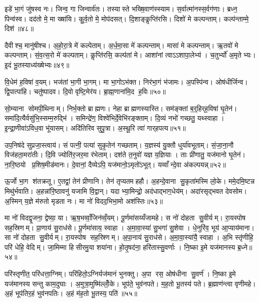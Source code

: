 इडे॑ भा॒गं जु॑षस्व नः। जिन्व॒ गा जिन्वार्व॑तः। तस्यास्ते भख्षि॒वाण॑स्स्याम। स॒र्वात्मा॑नस्स॒र्वग॑णाः। ब्रध्न॒ पिन्व॑स्व। दद॑तो मे॒ मा ख्षा॑यि। कु॒र्व॒तो मे॒ मोप॑दसत्। दि॒शाङ्कॢप्ति॑रसि। दिशो॑ मे कल्पन्ताम्। कल्प॑न्ताम्मे॒ दिश॑॥४८॥

दैवीश्च॒ मानु॑षीश्च। अ॒हो॒रा॒त्रे मे॑ कल्पेताम्। अ॒र्ध॒मा॒सा मे॑ कल्पन्ताम्। मासा॑ मे कल्पन्ताम्। ऋ॒तवो॑ मे कल्पन्ताम्। सं॒व॒त्स॒रो मे॑ कल्पताम्। कॢप्ति॑रसि॒ कल्प॑तां मे। आशा॑नां त्वाऽऽशापा॒लेभ्य॑। च॒तुर्भ्यो॑ अ॒मृतेभ्यः। इ॒दं भू॒तस्याध्य॑ख्षेभ्यः॥४९॥

वि॒धेम॑ ह॒विषा॑ व॒यम्। भज॑तां भा॒गी भा॒गम्। मा भा॒गोऽभ॑क्त। निर॑भा॒गं भ॑जामः। अ॒पस्पि॑न्व। ओष॑धीर्जिन्व। द्वि॒पात्पा॑हि। चतु॑ष्पादव। दि॒वो वृष्टि॒मेर॑य। ब्रा॒ह्म॒णाना॑मि॒द ह॒विः॥५०॥

सो॒म्याना सोमपी॒थिनाम्। निर्भ॒क्तो ब्राह्मणः। नेहा ब्राह्मणस्यास्ति। सम॑ङ्क्तां ब॒र्॒हिर्‌ह॒विषा॑ घृ॒तेन॑। समा॑दि॒त्यैर्वसु॑भि॒स्सम्म॒रुद्भि॑। समिन्द्रे॑ण॒ विश्वे॑भिर्दे॒वेभि॑रङ्क्ताम्। दि॒व्यं नभो॑ गच्छतु॒ यथ्स्वाहा। इ॒न्द्रा॒णीवा॑ऽविध॒वा भू॑यासम्। अदि॑तिरिव सुपु॒त्रा। अ॒स्थू॒रि त्वा॑ गार्‌हपत्य॥५१॥

उप॒निष॑दे सुप्रजा॒स्त्वाय॑। सं पत्नी॒ पत्या॑ सुकृ॒तेन॑ गच्छताम्। य॒ज्ञस्य॑ यु॒क्तौ धुर्या॑वभूताम्। सं॒जा॒ना॒नौ विज॑हता॒मरा॑तीः। दि॒वि ज्योति॑र॒जर॒मा र॑भेताम्। दश॑ते त॒नुवो॑ यज्ञ य॒ज्ञियाः। ताः प्री॑णातु॒ यज॑मानो घृ॒तेन॑। ना॒रि॒ष्ठयो प्र॒शिष॒मीड॑मानः। दे॒वानां॒ दैव्येऽपि॒ यज॑मानो॒ऽमृतो॑ऽभूत्। यव्वाँन्दे॒वा अ॑कल्पयन्न्॥५२॥

ऊ॒र्जो भा॒ग श॑तक्रतू। ए॒तद्वां॒ तेन॑ प्रीणानि। तेन॑ तृप्यतमहहौ। अ॒हन्दे॒वाना सु॒कृता॑मस्मि लो॒के। ममे॒दमि॒ष्टन्न मिथु॑र्भवाति। अ॒हन्ना॑रि॒ष्ठावनु॑ यजामि वि॒द्वान्। यदाभ्या॒मिन्द्रो॒ अद॑धाद्भाग॒धेय॑म्। अदा॑रसृद्भवत देवसोम। अ॒स्मिन् य॒ज्ञे म॑रुतो मृडता नः। मा नो॑ विदद॒भिभा॒मो अश॑स्तिः॥५३॥

मा नो॑ विदद्वृ॒जना॒ द्वेष्या॒ या। ऋ॒ष॒भव्वाँ॒जिन॑व्वँ॒यम्। पू॒र्णमा॑सय्यँजामहे। स नो॑ दोहता सु॒वीर्यम्। रा॒यस्पोष सह॒स्रिणम्। प्रा॒णाय॑ सु॒राध॑से। पू॒र्णमा॑साय॒ स्वाहा। अ॒मा॒वा॒स्या॑ सु॒भगा॑ सु॒शेवा। धे॒नुरि॑व॒ भूय॑ आ॒प्याय॑माना। सा नो॑ दोहता सु॒वीर्यम्। रा॒यस्पोष सह॒स्रिणम्। अ॒पा॒नाय॑ सु॒राध॑से। अ॒मा॒वा॒स्या॑यै॒ स्वाहा। अ॒भि स्तृ॑णीहि॒ परि॑ धेहि॒ वेदिम्। जा॒मिम्मा हिसीरमु॒या शया॑ना। हो॒तृ॒षद॑ना॒ हरि॑तास्सु॒वर्णाः। नि॒ष्का इ॒मे यज॑मानस्य ब्र॒ध्ने॥५४॥

परि॑स्तृणीत॒ परि॑धत्ता॒ग्निम्। परि॑हितो॒ऽग्निर्यज॑मानं भुनक्तु। अ॒पा रस॒ ओष॑धीना सु॒वर्ण॑। नि॒ष्का इ॒मे यज॑मानस्य सन्तु काम॒दुघाः। अ॒मुत्रा॒मुष्मि॑ल्लोँ॒के। भूप॑ते॒ भुव॑नपते। म॒ह॒तो भू॒तस्य॑ पते। ब्र॒ह्माण॑न्त्वा वृणीमहे। अ॒हं भूप॑तिर॒हं भुव॑नपतिः। अ॒हं म॑ह॒तो भू॒तस्य॒ पति॑॥५५॥

